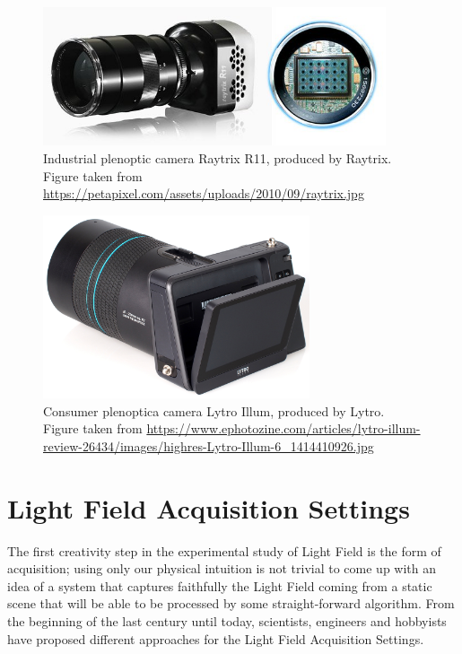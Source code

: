 \begin{figure}[h!]
\centering
\includegraphics[width= 0.90\textwidth]{./Diagrams/raytrix.jpg}
\caption{Industrial plenoptic camera Raytrix R11, produced by Raytrix. Figure taken from \url{https://petapixel.com/assets/uploads/2010/09/raytrix.jpg}}
\end{figure}

\bigskip

\begin{figure}[h!]
\centering
\includegraphics[width= 0.70\textwidth]{./Diagrams/lytro.jpg}
\caption{Consumer plenoptica camera Lytro Illum, produced by Lytro. Figure taken from \url{https://www.ephotozine.com/articles/lytro-illum-review-26434/images/highres-Lytro-Illum-6_1414410926.jpg}}
\end{figure}

\section{Light Field Acquisition Settings}
\label{sec:LF-acquisition}

The first creativity step in the experimental study of Light Field is the form of acquisition; using only our physical intuition is not trivial to come up with an idea of a system that captures faithfully the Light Field coming from a static scene that will be able to be processed by some straight-forward algorithm. From the beginning of the last century until today, scientists, engineers and hobbyists have proposed different approaches for the Light Field Acquisition Settings. 

